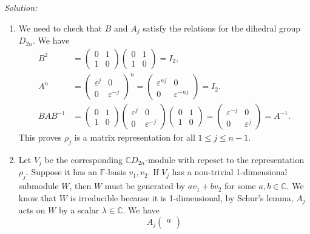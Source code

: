 \documentclass[a4paper, 12pt]{article}
\newenvironment{solution}
    {\textit{Solution:}}
    {}
\begin{document}
\begin{solution}
\begin{enumerate}[(1)]
\item We need to check that \(B\) and \(A_j\) satisfy the relations for the dihedral group \(D_{2n}\). We have 
\begin{align*}
B^2&=\begin{pmatrix}
	0&1\\ 
	1&0
\end{pmatrix}\begin{pmatrix}
	0&1\\ 
	1&0
\end{pmatrix}=I_2,\\ 
A^n&=\begin{pmatrix}
	\varepsilon^j&0\\ 
	0&\varepsilon^{-j}
\end{pmatrix}^n=\begin{pmatrix}
	\varepsilon^{nj}&0\\ 
	0&\varepsilon^{-nj}
\end{pmatrix}=I_2.\\ 
BAB^{-1}&=\begin{pmatrix}
	0&1\\ 
	1&0
\end{pmatrix}\begin{pmatrix}
	\varepsilon^j&0\\ 
	0&\varepsilon^{-j}
\end{pmatrix}\begin{pmatrix}
	0&1\\ 
	1&0
\end{pmatrix}=\begin{pmatrix}
	\varepsilon^{-j}&0\\ 
	0&\varepsilon^j
\end{pmatrix}=A^{-1}.
\end{align*}
This proves \(\rho_j\) is a matrix representation for all \(1\leq j\leq n-1\).
\item Let \(V_j\) be the corresponding \(\mathbb{C}D_{2n}\)-module with repesct to the representation \(\rho_j\). Suppose it has an \(\mathbb{F}\)-basis \(v_1,v_2\). If \(V_j\) has a non-trivial 1-dimensional submodule \(W\), then \(W\) must be generated by 
\(av_1+bv_2\) for some \(a,b\in \mathbb{C}\). We know that \(W\) is irreducible because it is 1-dimensional, by Schur's lemma, \(A_j\) acts on \(W\) by a scalar \(\lambda\in \mathbb{C}\). We have 
\[A_j\begin{pmatrix}
	a\\ 

\end{pmatrix}\]
\end{enumerate}
\end{solution}
\end{document}
